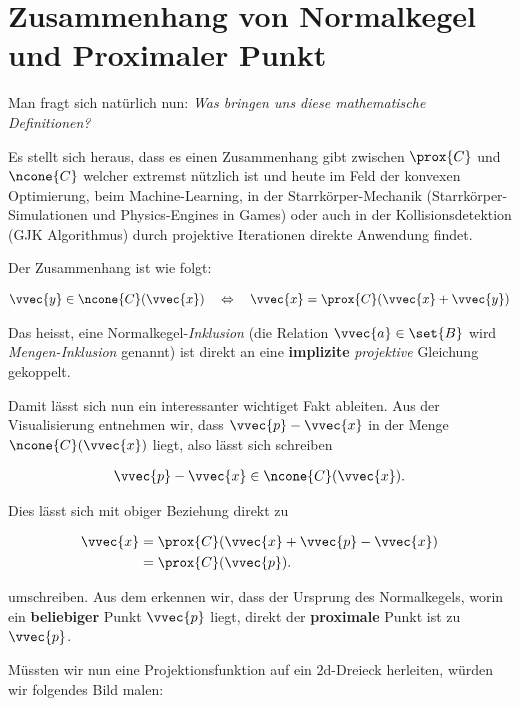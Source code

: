 \documentclass[
  12pt,
  american,
  a4paper,
  twoside,
  titlepage,
  openright,
  numbers=noenddot,
  chapterprefix=true,
  headings=optiontohead,
  svgnames,
  dvipsnames]{scrreprt}
\begin{document}
\hypertarget{zusammenhang-von-normalkegel-und-proximaler-punkt}{%
\section{Zusammenhang von Normalkegel und Proximaler
Punkt}\label{zusammenhang-von-normalkegel-und-proximaler-punkt}}

Man fragt sich natürlich nun: \emph{Was bringen uns diese mathematische
Definitionen?}

Es stellt sich heraus, dass es einen Zusammenhang gibt zwischen
\(\prox{C}\) und \(\ncone{C}\) welcher extremst nützlich ist und heute
im Feld der konvexen Optimierung, beim Machine-Learning, in der
Starrkörper-Mechanik (Starrkörper-Simulationen und Physics-Engines in
Games) oder auch in der Kollisionsdetektion (GJK Algorithmus) durch
projektive Iterationen direkte Anwendung findet.

Der Zusammenhang ist wie folgt:

\begin{align}
\vvec{y} \in \ncone{C}(\vvec{x}) \quad \Leftrightarrow \quad \vvec{x} = \prox{C}(\vvec{x} + \vvec{y})
\label{eq:prox-to-ncone}
\end{align}

Das heisst, eine Normalkegel-\emph{Inklusion} (die Relation
\(\vvec{a} \in \set{B}\) wird \emph{Mengen-Inklusion} genannt) ist
direkt an eine \textbf{implizite} \emph{projektive} Gleichung gekoppelt.

Damit lässt sich nun ein interessanter wichtiget Fakt ableiten. Aus der
Visualisierung  entnehmen wir, dass
\(\vvec{p}-\vvec{x}\) in der Menge \(\ncone{C}(\vvec{x})\) liegt, also
lässt sich schreiben

\begin{align}
\vvec{p}-\vvec{x} \in \ncone{C}(\vvec{x}).
\end{align}

Dies lässt sich mit obiger Beziehung direkt zu

\begin{align}
\vvec{x} &= \prox{C}(\vvec{x} + \vvec{p} - \vvec{x}) \\
&= \prox{C}(\vvec{p}).
\end{align}

umschreiben. Aus dem erkennen wir, dass der Ursprung des Normalkegels,
worin ein \textbf{beliebiger} Punkt \(\vvec{p}\) liegt, direkt der
\textbf{proximale} Punkt ist zu \(\vvec{p}\).

Müssten wir nun eine Projektionsfunktion auf ein \(2\)d-Dreieck
herleiten, würden wir folgendes Bild malen:
\end{document}
